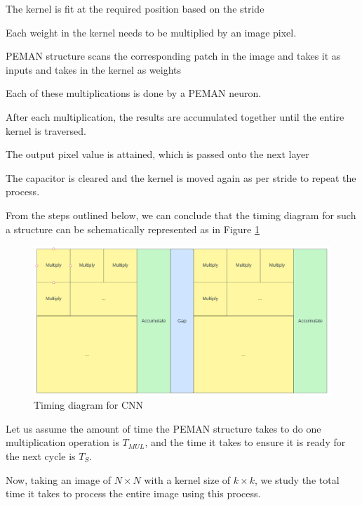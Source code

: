 \documentclass[wide]{adonis}
\begin{document}
\begin{list}{•}{}
	\item The kernel is fit at the required position based on the stride
	\item Each weight in the kernel needs to be multiplied by an image pixel.
	\item PEMAN structure scans the corresponding patch in the image and takes it as inputs and takes in the kernel as weights
	\item Each of these multiplications is done by a PEMAN neuron.
	\item After each multiplication, the results are accumulated together until the entire kernel is traversed.
	\item The output pixel value is attained, which is passed onto the next layer
	\item The capacitor is cleared and the kernel is moved again as per stride to repeat the process.
\end{list}

From the steps outlined below, we can conclude that the timing diagram for such a structure can be schematically represented as in Figure \ref{cnn_timing_diagram}

\begin{figure}
	\centering
	\includegraphics[width=\textwidth]{images/convTiming.png}
	\caption{Timing diagram for CNN}
	\label{cnn_timing_diagram}
\end{figure}

Let us assume the amount of time the PEMAN structure takes to do one multiplication operation is $T_{MUL}$, and the time it takes to ensure it is ready for the next cycle is $T_S$.

Now, taking an image of $N\times N$ with a kernel size of $k \times k$, we study the total time it takes to process the entire image using this process.
\end{document}
